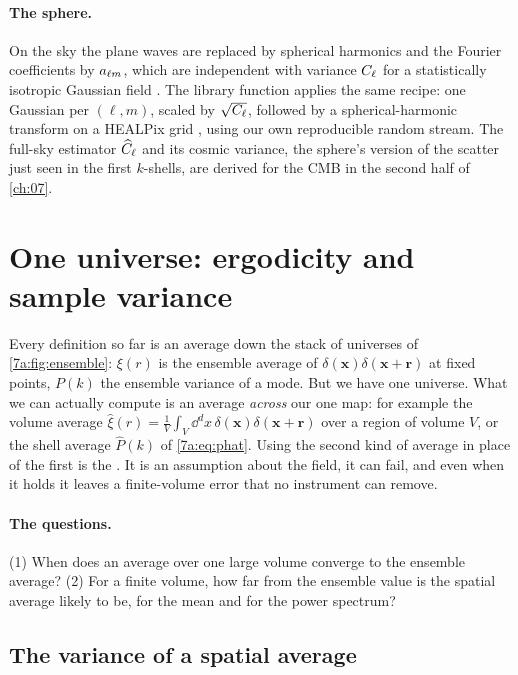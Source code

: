 \paragraph{The sphere.}
On the sky the plane waves are replaced by spherical harmonics and the Fourier
coefficients by $a_{\ell m}$, which are independent with variance $C_\ell$ for a
statistically isotropic Gaussian field . The
library function  applies the same recipe: one
Gaussian per $(\ell,m)$, scaled by $\sqrt{C_\ell}$, followed by a spherical-harmonic
transform on a HEALPix grid \cite{Gorski2005}, using our own reproducible random
stream. The full-sky estimator $\widehat{C}_\ell$ and its cosmic variance, the sphere's
version of the scatter just seen in the first $k$-shells, are derived for the CMB
in the second half of \cref{ch:07}.
\section{One universe: ergodicity and sample variance}
\label{7a:sec:ergodic}

Every definition so far is an average down the stack of universes of
\cref{7a:fig:ensemble}: $\xi(r)$ is the ensemble average of
$\delta(\bm x)\delta(\bm x+\bm r)$ at fixed points, $P(k)$ the ensemble variance of
a mode. But we have one universe. What we can actually compute is an average
\emph{across} our one map: for example the volume average
$\hat\xi(r)=\frac1V\int_V\dd^dx\,\delta(\bm x)\delta(\bm x+\bm r)$ over a region
of volume $V$, or the shell average $\hat P(k)$ of \eqref{7a:eq:phat}. Using the
second kind of average in place of the first is the . It is an assumption about the field, it can fail, and even when it
holds it leaves a finite-volume error that no instrument can remove.

\paragraph{The questions.} (1) When does an average over one large volume
converge to the ensemble average? (2) For a finite volume, how far from the
ensemble value is the spatial average likely to be, for the mean and for the
power spectrum?

\subsection{The variance of a spatial average}
\label{7a:sec:var-mean}

